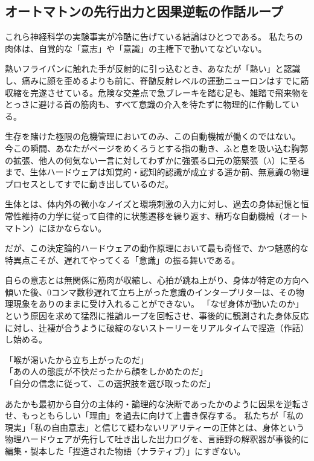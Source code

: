 \ifja
    \subsection{オートマトンの先行出力と因果逆転の作話ループ}
    これら神経科学の実験事実が冷酷に告げている結論はひとつである。
    私たちの肉体は、自覚的な「意志」や「意識」の主権下で動いてなどいない。

    熱いフライパンに触れた手が反射的に引っ込むとき、あなたが「熱い」と認識し、痛みに顔を歪めるよりも前に、脊髄反射レベルの運動ニューロンはすでに筋収縮を完遂させている。危険な交差点で急ブレーキを踏む足も、雑踏で飛来物をとっさに避ける首の筋肉も、すべて意識の介入を待たずに物理的に作動している。

    生存を賭けた極限の危機管理においてのみ、この自動機械が働くのではない。
    今この瞬間、あなたがページをめくろうとする指の動き、ふと息を吸い込む胸郭の拡張、他人の何気ない一言に対してわずかに強張る口元の筋緊張（$\lambda$）に至るまで、生体ハードウェアは知覚的・認知的認識が成立する遥か前、無意識の物理プロセスとしてすでに動き出しているのだ。

    生体とは、体内外の微小なノイズと環境刺激の入力に対し、過去の身体記憶と恒常性維持の力学に従って自律的に状態遷移を繰り返す、精巧な自動機械（オートマトン）にほかならない。

    だが、この決定論的ハードウェアの動作原理において最も奇怪で、かつ魅惑的な特異点こそが、遅れてやってくる「意識」の振る舞いである。

    自らの意志とは無関係に筋肉が収縮し、心拍が跳ね上がり、身体が特定の方向へ傾いた後、0コンマ数秒遅れて立ち上がった意識のインタープリターは、その物理現象をありのままに受け入れることができない。
    「なぜ身体が動いたのか」という原因を求めて猛烈に推論ループを回転させ、事後的に観測された身体反応に対し、辻褄が合うように破綻のないストーリーをリアルタイムで捏造（作話）し始める。

    「喉が渇いたから立ち上がったのだ」\\
    「あの人の態度が不快だったから顔をしかめたのだ」\\
    「自分の信念に従って、この選択肢を選び取ったのだ」

    あたかも最初から自分の主体的・論理的な決断であったかのように因果を逆転させ、もっともらしい「理由」を過去に向けて上書き保存する。
    私たちが「私の現実」「私の自由意志」と信じて疑わないリアリティーの正体とは、身体という物理ハードウェアが先行して吐き出した出力ログを、言語野の解釈器が事後的に編集・製本した「捏造された物語（ナラティブ）」にすぎない。

